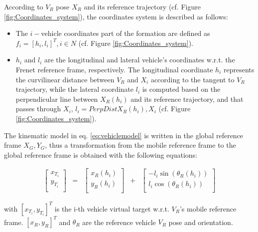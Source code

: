 \begin{itemize}
According to $V_R$ pose $X_R$ and its reference trajectory (cf. Figure \ref{fig:Coordinates_system}), the coordinates system is described as follows: 

\begin{itemize}
    \item The $i-$vehicle coordinates part of the formation are defined as $f_i=[h_i,l_i]^T, i\in {N}$ (cf. Figure \ref{fig:Coordinates_system}). 

    \item $h_i$ and $l_i$ are the longitudinal and lateral vehicle's coordinates w.r.t. the Frenet reference frame, respectively. The longitudinal coordinate $h_i$ represents the curvilinear distance between $V_R$ and $X_i$ according to the tangent to $V_R$ trajectory, while the lateral coordinate $l_i$ is computed based on the perpendicular line between $X_R(h_i)$ and its reference trajectory, and that passes through $X_i$, $l_i=PerpDist{X_R(h_i),X_i}$ (cf. Figure \ref{fig:Coordinates_system}). 
\end{itemize}


The kinematic model in eq. \ref{eq:vehiclemodel} is written in the global reference frame ${X_G, Y_G}$, thus a transformation from the mobile reference frame to the global reference frame is obtained with the following equations: 

\begin{equation} \label{eq:frenetToCartisian}
\begin{matrix}
\begin{bmatrix}
x_{T_i} \\
y_{T_i} \\
\end{bmatrix}
& = & \begin{bmatrix}
x_{R}(h_i)\\
y_{R}(h_i) \\
\end{bmatrix}
& + & \begin{bmatrix}
-l_i\sin(\theta_R(h_i)) \\
l_i\cos(\theta_R(h_i)) \\
\end{bmatrix}
\end{matrix}
\end{equation}


with $[x_{T_i},y_{T_i}]^T$ is the i-th vehicle virtual target w.r.t. $V_R$'s mobile reference frame. $[x_R,y_R]^T$ and $\theta_R$ are the reference vehicle $V_R$ pose and orientation.




\end{itemize}
